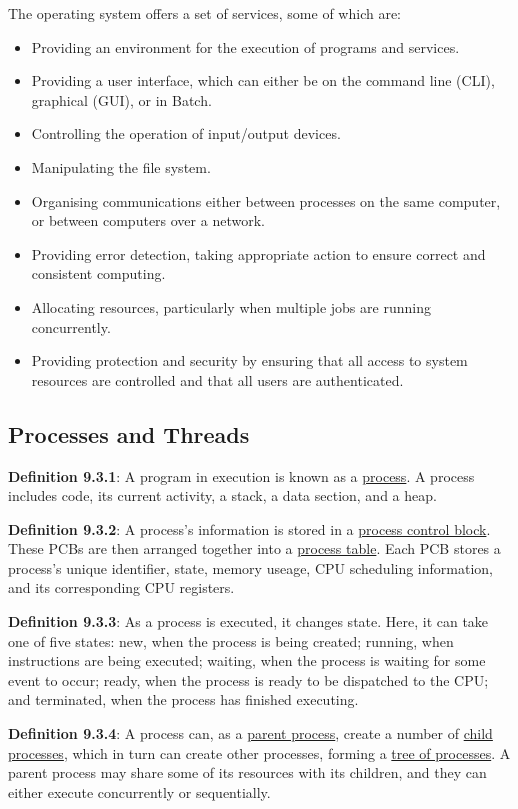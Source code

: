 \documentclass{article}
\newcommand{\separate}[1] {\vspace{#1 pt}\noindent}
\newcommand{\definition}[2]{\textbf{Definition #1}: #2\label{def:#1}}
\begin{document}
\separate{5}The operating system offers a set of services, some of which are:
\begin{itemize}
    \item Providing an environment for the execution of programs and services.
    \item Providing a user interface, which can either be on the command line (CLI), graphical (GUI), or in Batch.
    \item Controlling the operation of input/output devices.
    \item Manipulating the file system.
    \item Organising communications either between processes on the same computer, or between computers over a network.
    \item Providing error detection, taking appropriate action to ensure correct and consistent computing.
    \item Allocating resources, particularly when multiple jobs are running concurrently.
    \item Providing protection and security by ensuring that all access to system resources are controlled and that all users are authenticated.
\end{itemize}

\subsection{Processes and Threads}

\definition{9.3.1}{A program in execution is known as a \underline{process}. A process includes code, its current activity, a stack, a data section, and a heap.}

\separate{5}\definition{9.3.2}{A process's information is stored in a \underline{process control block}. These PCBs are then arranged together into a \underline{process table}. Each PCB stores a process's unique identifier, state, memory useage, CPU scheduling information, and its corresponding CPU registers.}

\separate{5}\definition{9.3.3}{As a process is executed, it changes state. Here, it can take one of five states: new, when the process is being created; running, when instructions are being executed; waiting, when the process is waiting for some event to occur; ready, when the process is ready to be dispatched to the CPU; and terminated, when the process has finished executing.}

\separate{5}\definition{9.3.4}{A process can, as a \underline{parent process}, create a number of \underline{child processes}, which in turn can create other processes, forming a \underline{tree of processes}. A parent process may share some of its resources with its children, and they can either execute concurrently or sequentially.}
\end{document}
